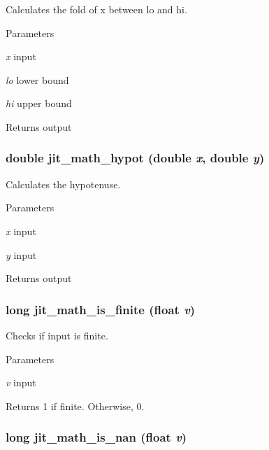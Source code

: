 Calculates the fold of x between lo and hi. 
\begin{DoxyParams}{Parameters}
\item[{\em x}]input \item[{\em lo}]lower bound \item[{\em hi}]upper bound \end{DoxyParams}
\begin{DoxyReturn}{Returns}
output 
\end{DoxyReturn}
\hypertarget{group__mathmod_ga52b4fbb8dfa64fd3758e22993e7476ca}{
\subsubsection[{jit\_\-math\_\-hypot}]{\setlength{\rightskip}{0pt plus 5cm}double jit\_\-math\_\-hypot (double {\em x}, \/  double {\em y})}}
\label{group__mathmod_ga52b4fbb8dfa64fd3758e22993e7476ca}


Calculates the hypotenuse. 
\begin{DoxyParams}{Parameters}
\item[{\em x}]input \item[{\em y}]input \end{DoxyParams}
\begin{DoxyReturn}{Returns}
output 
\end{DoxyReturn}
\hypertarget{group__mathmod_gaed663cf800c154ac4aa648f445433117}{
\subsubsection[{jit\_\-math\_\-is\_\-finite}]{\setlength{\rightskip}{0pt plus 5cm}long jit\_\-math\_\-is\_\-finite (float {\em v})}}
\label{group__mathmod_gaed663cf800c154ac4aa648f445433117}


Checks if input is finite. 
\begin{DoxyParams}{Parameters}
\item[{\em v}]input \end{DoxyParams}
\begin{DoxyReturn}{Returns}
1 if finite. Otherwise, 0. 
\end{DoxyReturn}
\hypertarget{group__mathmod_ga3c3b5e73ae2793198e67053e4569421b}{
\subsubsection[{jit\_\-math\_\-is\_\-nan}]{\setlength{\rightskip}{0pt plus 5cm}long jit\_\-math\_\-is\_\-nan (float {\em v})}}
\label{group__mathmod_ga3c3b5e73ae2793198e67053e4569421b}


